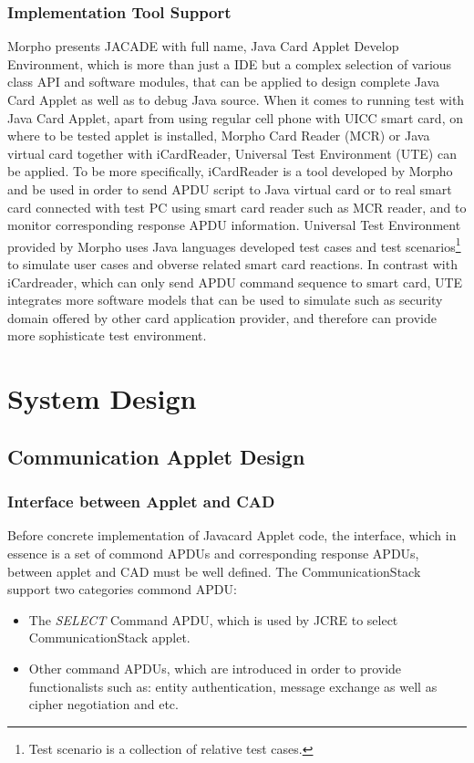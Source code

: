 \documentclass[]{llncs}
\begin{document}
\subsubsection{Implementation Tool Support}
Morpho presents JACADE with full name, Java Card Applet Develop Environment, which is more than just a IDE but a complex selection of various class API and software modules, that can be applied to design complete Java Card Applet as well as to debug Java source. When it comes to running test with Java Card Applet, apart from using regular cell phone with UICC smart card, on where to be tested applet is installed, Morpho Card Reader (MCR) or Java virtual card together with iCardReader, Universal Test Environment (UTE) can be applied. To be more specifically, iCardReader is a tool developed by Morpho and be used in order to send APDU script to Java virtual card or to real smart card connected with test PC using smart card reader such as MCR reader, and to monitor corresponding response APDU information. Universal Test Environment provided by Morpho uses Java languages developed test cases and test scenarios\footnote{Test scenario is a collection of relative test cases.} to simulate user cases and obverse related smart card reactions. In contrast with iCardreader, which can only send APDU command sequence to smart card, UTE integrates more software models that can be used to simulate such as security domain offered by other card application provider, and therefore can provide more sophisticate test environment.
\section{System Design}
\subsection{Communication Applet Design}
\subsubsection {Interface between Applet and CAD}
Before concrete implementation of Javacard Applet code, the interface, which in essence is a set of commond APDUs and corresponding response APDUs, between applet and CAD must be well defined.  The CommunicationStack support two categories commond APDU:
 \begin{itemize}
  \item The \emph{SELECT} Command APDU, which is used by JCRE to select CommunicationStack applet.
  \item Other command APDUs, which are introduced in order to provide functionalists such as: entity authentication, message exchange as well as cipher negotiation and etc.
\end{itemize}
\end{document}
